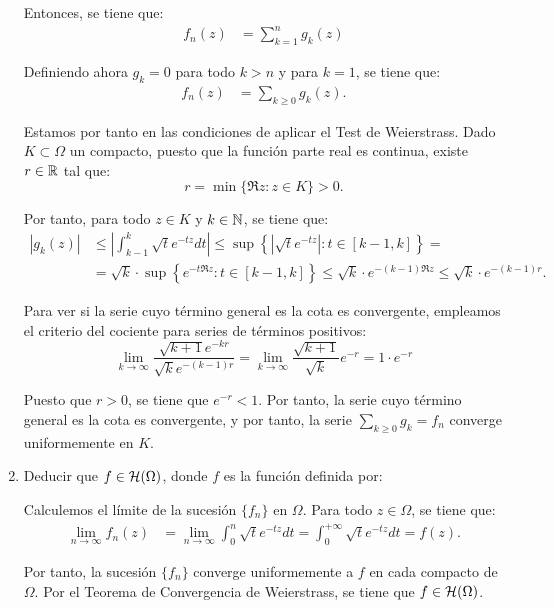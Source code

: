 \begin{ejercicio}
\begin{enumerate}
        Entonces, se tiene que:
        \begin{align*}
            f_n(z) &= \sum_{k=1}^n g_k(z)
        \end{align*}

        Definiendo ahora $g_k=0$ para todo $k>n$ y para $k=1$, se tiene que:
        \begin{align*}
            f_n(z) &= \sum_{k\geq 0} g_k(z).
        \end{align*}

        Estamos por tanto en las condiciones de aplicar el Test de Weierstrass. Dado $K\subset \Omega$ un compacto, puesto que la función parte real es continua, existe $r\in\mathbb{R}$ tal que:
        \[
        r= \min\{\Re z : z\in K\} > 0.
        \]

        Por tanto, para todo $z\in K$ y $k\in\mathbb{N}$, se tiene que:
        \begin{align*}
            \left|g_k(z)\right| &\leq \left|\int_{k-1}^k \sqrt{t} e^{-tz} dt\right| \leq \sup\left\{\left|\sqrt{t} e^{-tz}\right| : t\in [k-1,k]\right\}
            =\\&= \sqrt{k} \cdot \sup\left\{e^{-t\Re z} : t\in [k-1,k]\right\}
            \leq \sqrt{k} \cdot e^{-(k-1)\Re z}
            \leq \sqrt{k} \cdot e^{-(k-1)r}.
        \end{align*}

        Para ver si la serie cuyo término general es la cota es convergente, empleamos el criterio del cociente para series de términos positivos:
        \begin{equation*}
            \lim_{k\to\infty} \dfrac{\sqrt{k+1} e^{-kr}}{\sqrt{k} e^{-(k-1)r}} = \lim_{k\to\infty} \dfrac{\sqrt{k+1}}{\sqrt{k}} e^{-r} = 1\cdot e^{-r}
        \end{equation*}

        Puesto que $r>0$, se tiene que $e^{-r}<1$. Por tanto, la serie cuyo término general es la cota es convergente, y por tanto, la serie $\sum\limits_{k\geq 0} g_k=f_n$ converge uniformemente en $K$.


        \item Deducir que $f\in \mathcal{H}(\Omega)$, donde $f$ es la función definida por:

        Calculemos el límite de la sucesión $\{f_n\}$ en $\Omega$. Para todo $z\in\Omega$, se tiene que:
        \begin{align*}
            \lim_{n\to\infty} f_n(z) &= \lim_{n\to\infty} \int_0^n \sqrt{t} e^{-tz} dt
            = \int_0^{+\infty} \sqrt{t} e^{-tz} dt
            = f(z).
        \end{align*}

        Por tanto, la sucesión $\{f_n\}$ converge uniformemente a $f$ en cada compacto de $\Omega$. Por el Teorema de Convergencia de Weierstrass, se tiene que $f\in \mathcal{H}(\Omega)$.
    \end{enumerate}
\end{ejercicio}
